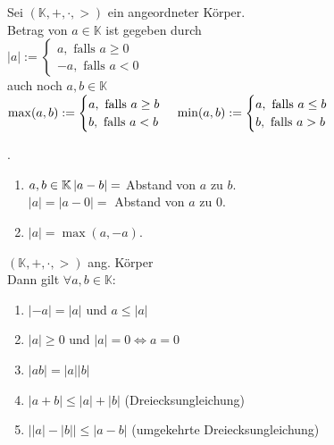\documentclass[../ana1.tex]{subfiles}
\begin{document}
\begin{defi}[Betrag]
	Sei $(\mathbb{K}, +,\cdot,>)$ ein angeordneter Körper.\\
	Betrag von $a\in\mathbb{K}$ ist gegeben durch\\
	$\left| a\right| :=
		\begin{cases}
			a, \text{ falls } a\geq 0 \\
			-a, \text{ falls }a<0
		\end{cases}$\\
	auch noch $a,b\in \mathbb{K}$\\
	$\max(a,b) :=
		\begin{cases}
			a, \text{ falls } a\geq b \\
			b, \text{ falls } a < b
		\end{cases}\\
		\min(a,b) :=
		\begin{cases}
			a, \text{ falls } a\leq b \\
			b, \text{ falls } a > b
		\end{cases}$\\
\end{defi}
\begin{bem} . %
	\begin{enumerate}
		\item $a,b\in \mathbb{K}\\
			      \left| a-b\right| = $ Abstand von $a$ zu $b$.\\
		      $\left| a\right| = \left| a-0\right| = $ Abstand von $a$ zu $0$.
		\item $\left| a\right| = \max(a, -a)$.
	\end{enumerate}
\end{bem}
\begin{satz}
	$(\mathbb{K},+,\cdot,>)$ ang. Körper\\
	Dann gilt $\forall a,b\in\mathbb{K}:$
	\begin{enumerate}
		\item $\left|-a\right| = \left| a\right|$ und $a\leq\left|a\right|$
		\item $\left| a\right| \geq 0$ und $\left| a\right| = 0 \Leftrightarrow a = 0$
		\item $\left| ab\right| = \left| a\right| \left| b\right|$
		\item $\left| a+b\right| \leq \left| a\right| + \left|b\right|$ (Dreiecksungleichung)
		\item $\left|\left|a\right|-\left|b\right|\right| \leq \left| a-b\right|$ (umgekehrte Dreiecksungleichung)
	\end{enumerate}
\end{satz}
\end{document}
